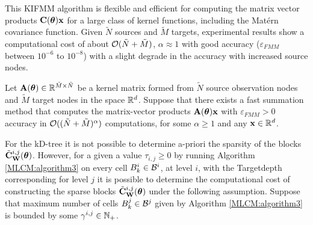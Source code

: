 \documentclass[11pt,final]{amsart}       %
\begin{document}
This KIFMM algorithm is flexible and efficient for computing the
matrix vector products $\mathbf{C}(\boldsymbol{\theta})\mathbf{x}$ for a large class of kernel
functions, including the Mat\'{e}rn covariance function.  Given
$\tilde N$ sources and $\tilde M$ targets, experimental results show a
computational cost of about ${\mathcal O}(\tilde N + \tilde M)$, $\alpha
\approx 1$ with good accuracy ($\varepsilon_{FMM}$ between $10^{-6}$
to $10^{-8}$) with a slight degrade in the accuracy with increased
source nodes.


\begin{asum} Let $\mathbf{A}(\boldsymbol{\theta}) \in \Bbb{R}^{\tilde M \times \tilde N}$ be a kernel
matrix formed from $\tilde N$ source observation nodes and $\tilde M$
target nodes in the space $\Bbb{R}^{d}$.  Suppose that there exists a fast
summation method that computes the matrix-vector products
$\mathbf{A}(\boldsymbol{\theta})\mathbf{x}$ with $\varepsilon_{FMM}>0$ accuracy in ${\mathcal O}((\tilde
N + \tilde M)^{\alpha})$ computations, for some $\alpha \geq 1$ and
any $\mathbf{x} \in \Bbb{R}^{d}$.
\end{asum}


For the kD-tree it is not possible to determine a-priori the sparsity
of the blocks $\tilde{\mathbf{C}}^{i,j}_{\mathbf{W}}(\boldsymbol{\theta})$.
However, for a given a value $\tau_{i,j} \geq 0$ by running Algorithm
\ref{MLCM:algorithm3} on every cell $B^{i}_k \in {\mathcal B}^{i}$, at level
$i$, with the Targetdepth corresponding for level $j$ it is possible
to determine the computational cost of constructing the sparse blocks
$\tilde{\mathbf{C}}^{i,j}_{\mathbf{W}}(\boldsymbol{\theta})$ under the following assumption. Suppose
that maximum number of cells $B^{j}_k \in {\mathcal B}^{j}$ given by Algorithm
\ref{MLCM:algorithm3} is bounded by some $\gamma^{i,j} \in \mathbb{N}_+$.
\end{document}
